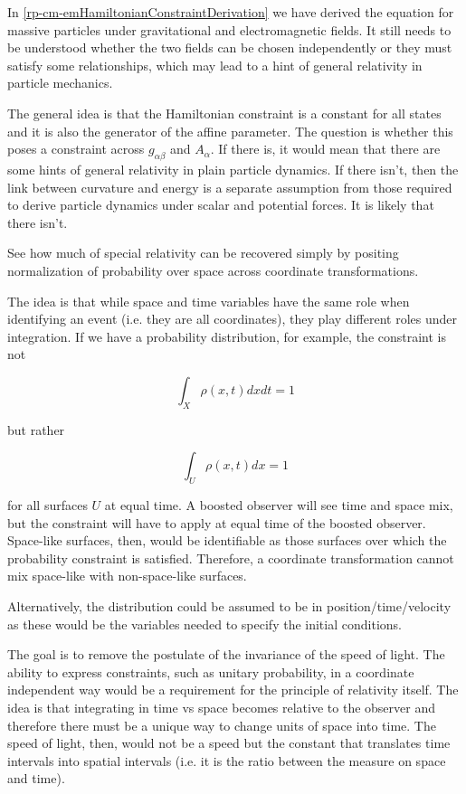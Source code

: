 {In \ref{rp-cm-emHamiltonianConstraintDerivation} we have derived the equation for massive particles under gravitational and electromagnetic fields. It still needs to be understood whether the two fields can be chosen independently or they must satisfy some relationships, which may lead to a hint of general relativity in particle mechanics.}

The general idea is that the Hamiltonian constraint is a constant for all states and it is also the generator of the affine parameter. The question is whether this poses a constraint across $g_{\alpha\beta}$ and $A_\alpha$. If there is, it would mean that there are some hints of general relativity in plain particle dynamics. If there isn’t, then the link between curvature and energy is a separate assumption from those required to derive particle dynamics under scalar and potential forces. It is likely that there isn't.

{See how much of special relativity can be recovered simply by positing normalization of probability over space across coordinate transformations.}

The idea is that while space and time variables have the same role when identifying an event (i.e. they are all coordinates), they play different roles under integration. If we have a probability distribution, for example,
the constraint is not

$$ \int_X \rho(x, t) dx dt = 1 $$

but rather

$$ \int_U \rho(x, t) dx = 1 $$

for all surfaces $U$ at equal time. A boosted observer will see time and space mix, but the constraint will have to apply at equal time of the boosted observer. Space-like surfaces, then, would be identifiable as those surfaces over which the probability constraint is satisfied. Therefore, a coordinate transformation cannot mix space-like with non-space-like surfaces.

Alternatively, the distribution could be assumed to be in position/time/velocity as these would be the variables needed to specify the initial conditions.

The goal is to remove the postulate of the invariance of the speed of light. The ability to express constraints, such as unitary probability, in a coordinate independent way would be a requirement for the principle of relativity itself. The idea is that integrating in time vs space becomes relative to the observer and therefore there must be a unique way to change units of space into time. The speed of light, then, would not be a speed but the constant that translates time intervals into spatial intervals (i.e. it is the ratio between the measure on space and time).


